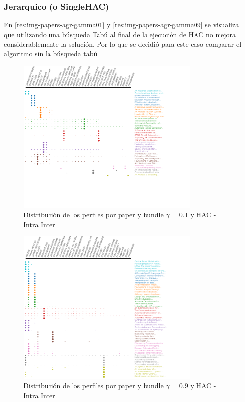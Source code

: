 \subsubsection{Jerarquico (o SingleHAC)}
En \ref{res:img-papers-agr-gamma01} y \ref{res:img-papers-agr-gamma09} se visualiza que utilizando una búsqueda Tabú al final de la ejecución  de HAC no mejora considerablemente la solución. Por lo que se decidió para este caso comparar el algoritmo sin la búsqueda tabú.
\begin{figure}[H]
  \centering
    \includegraphics[width=0.8\textwidth]{resultados/papers/HAC/INTRA_INTER/gamma-01.png}
  \caption{Distribución de los perfiles por paper y bundle $\gamma$ = $0.1$ y HAC - Intra Inter}
  \label{res:img-papers-gamma01-hac-intra-inter}
\end{figure}

\begin{figure}[H]
  \centering
    \includegraphics[width=0.8\textwidth]{resultados/papers/HAC/INTRA_INTER/gamma-09.png}
  \caption{Distribución de los perfiles por paper y bundle $\gamma$ = $0.9$ y HAC - Intra Inter}
  \label{res:img-papers-gamma09-hac-intra-inter}
\end{figure}

